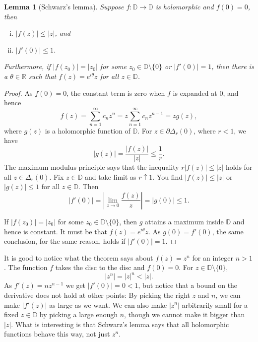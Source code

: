 \documentclass[12pt,openany]{book}
\newcommand{\sabs}[1]{\lvert {#1} \rvert}
\newcommand{\abs}[1]{\left\lvert {#1} \right\rvert}
\newcommand{\R}{{\mathbb{R}}}
\newcommand{\D}{{\mathbb{D}}}
\theoremstyle{plain}
\newtheorem{lemma}[thm]{Lemma}
\theoremstyle{remark}
\theoremstyle{definition}
\theoremstyle{exercise}
\theoremstyle{example}
\begin{document}
\begin{lemma}[Schwarz's lemma]\label{lemma:schwarz}
Suppose $f \colon \D \to \D$ is holomorphic and $f(0) = 0$,
then 
\begin{enumerate}[(i)]
\item $\sabs{f(z)} \leq \sabs{z}$, and
\item $\sabs{f'(0)} \leq 1$.
\end{enumerate}
Furthermore, if $\sabs{f(z_0)} = \sabs{z_0}$ for some $z_0 \in \D \setminus
\{ 0 \}$
or $\sabs{f'(0)} = 1$, then
there is a $\theta \in \R$ such that $f(z) =
e^{i\theta} z$ for all $z \in \D$.
\end{lemma}

\begin{proof}
As $f(0) = 0$, the constant term is zero when $f$ is expanded at $0$, and hence
\begin{equation*}
f(z) = \sum_{n=1}^\infty c_n z^n = z \sum_{n=1}^\infty c_n z^{n-1} = z g(z) ,
\end{equation*}
where $g(z)$ is a holomorphic function of $\D$.  For
$z \in \partial \Delta_r(0)$,
where $r < 1$, we have
\begin{equation*}
\sabs{g(z)} = \frac{\sabs{f(z)}}{\sabs{z}} \leq \frac{1}{r} .
\end{equation*}
The maximum modulus principle says that the inequality
$r \sabs{f(z)} \leq \sabs{z}$
holds for all $z \in \Delta_r(0)$.
Fix $z \in \D$ and take limit as $r \uparrow 1$. 
You find $\sabs{f(z)} \leq \sabs{z}$ or
$\sabs{g(z)} \leq 1$ for all $z
\in \D$.  Then
\begin{equation*}
\abs{f'(0)}
=
\abs{\lim_{z \to 0} \frac{f(z)}{z}} = \sabs{g(0)} \leq 1 .
\end{equation*}

If $\sabs{f(z_0)} = \sabs{z_0}$ for some $z_0 \in \D \setminus \{ 0 \}$,
then $g$ attains a maximum inside $\D$ and hence is constant.
It must be that $f(z) = e^{i \theta} z$.
As $g(0) = f'(0)$, the same conclusion, for the same reason,
holds if $\sabs{f'(0)} = 1$.
\end{proof}

It is good to notice what the theorem says about $f(z) = z^n$
for an integer $n > 1$.  The function $f$ takes the disc to the disc
and $f(0) = 0$.  For $z \in \D \setminus \{ 0 \}$,
\begin{equation*}
\sabs{z^n} =
\sabs{z}^n < \sabs{z} .
\end{equation*}
As $f'(z) = n z^{n-1}$ we get
$\sabs{f'(0)} = 0 < 1$, but notice that a bound on the derivative
does not hold at other points:
By picking the right $z$ and $n$,
we can make $\sabs{f'(z)}$ as large as we want.
We can also make $\sabs{z^n}$ arbitrarily small for a fixed $z \in \D$ by picking
a large enough $n$, though we cannot make it bigger than $\sabs{z}$.  What is
interesting is that Schwarz's lemma says that all holomorphic functions
behave this way, not just $z^n$.
\end{document}
